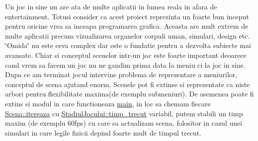 Un joc in sine nu are ata de multe aplicatii in lumea reala in afara de entertainment. Totusi consider ca acest proiect reprezinta un foarte bun inceput pentru oricine vrea sa inceapa programarea grafica. Aceasta are mult extrem de multe aplicatii precum vizualizarea organelor corpuli uman, simulari, design etc. \char`\"{}\+Omida\char`\"{} nu este ceva complex dar este o fundatie pentru a dezvolta subiecte mai avansate. Chiar si conceptul scenelor intr-\/un joc este foarte important deoarece cand vrem sa facem un joc nu ne gandim prima data la meniu ci la joc in sine. Dupa ce am terminat jocul intervine problema de reprezentare a meniurilor, conceptul de scena ajutand enorm. Scenele pot fi extinse si reprezentate ca niste arbori pentru flexibilitate maxima(de exemplu submeniuri). De asemenea poate fi extins si modul in care functioneaza \hyperlink{main_8cpp_ae66f6b31b5ad750f1fe042a706a4e3d4}{main}, in loc sa chemam fiecare \hyperlink{classScena_a9e5fcc831ed410b5b2422231ede746ee}{Scena\+::itereaza} cu \hyperlink{classStadiulJocului_a338b9e5467ad6d4d355c3978e04d32d6}{Stadiul\+Jocului\+::timp\+\_\+trecut} variabil, putem stabili un timp maxim (de exemplu 60fps) cu care sa actualizam scena, folositor in cazul unei simulari in care legile fizicii depind foarte mult de timpul trecut. 